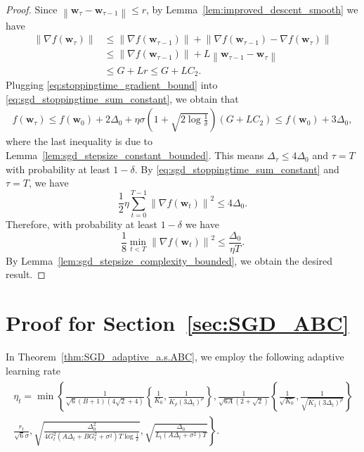 \documentclass{article}
\newcommand{\Norm}[1]{\left\|#1\right\|}
\newcommand{\paren}[1]{\left( #1 \right)}
\newcommand{\bw}{\mathbf{w}}
\begin{document}
\begin{proof}
    Since $\Norm{\bw_\tau-\bw_{\tau-1}}\leq r$, by Lemma~\ref{lem:improved_descent_smooth} we have
    \begin{equation}\label{eq:stoppingtime_gradient_bound}
        \begin{aligned}
            \Norm{\nabla f(\bw_\tau)}&\leq\Norm{\nabla f(\bw_{\tau-1})}+\Norm{\nabla f(\bw_{\tau-1})-\nabla f(\bw_\tau)}\\
            &\leq \Norm{\nabla f(\bw_{\tau-1})}+L\Norm{\bw_{\tau-1}-\bw_\tau}\\
            &\leq G+Lr\leq G+LC_2.
        \end{aligned}
    \end{equation}
    Plugging \eqref{eq:stoppingtime_gradient_bound} into \eqref{eq:sgd_stoppingtime_sum_constant}, we obtain that
    \begin{align*}
        f(\bw_\tau)\leq f(\bw_0)+2\Delta_0+\eta\sigma\paren{1+\sqrt{2\log\frac{1}{\delta}}}\paren{G+LC_2}\leq f(\bw_0)+3\Delta_0,
    \end{align*}
    where the last inequality is due to Lemma~\ref{lem:sgd_stepsize_constant_bounded}. This means $\Delta_\tau\leq 4\Delta_0$ and $\tau=T$ with probability at least $1-\delta$. By \eqref{eq:sgd_stoppingtime_sum_constant} and $\tau=T$, we have
    $$\frac{1}{2}\eta\sum_{t=0}^{T-1}\Norm{\nabla f(\bw_t)}^2\leq 4\Delta_0.$$
    Therefore, with probability at least $1-\delta$ we have
    $$\frac{1}{8}\min_{t<T}\Norm{\nabla f(\bw_t)}^2\leq \frac{\Delta_0}{\eta T}.$$
    By Lemma~\ref{lem:sgd_stepsize_complexity_bounded}, we obtain the desired result.
    
\end{proof}

\section{Proof for Section~\ref{sec:SGD_ABC}}\label{apx:pf_ABC}
In Theorem~\ref{thm:SGD_adaptive_a.s.ABC}, we employ the following adaptive learning rate
\begin{align}\label{eq:learning_rate_thm_ABC_adaptive}
    \begin{gathered}
    \eta_t=\min \left\{\frac{1}{\sqrt{6}(B+1)(4 \sqrt{2}+4)}\left\{\frac{1}{K_0}, \frac{1}{K_\rho\left(3 \Delta_t\right)^\rho}\right\}, \frac{1}{\sqrt{6 A}(2+\sqrt{2})}\left\{\frac{1}{\sqrt{K_0}}, \frac{1}{\sqrt{K_1\left(3 \Delta_t\right)^\rho}}\right\}\right. \\
    \left.\frac{r_t}{\sqrt{6} \sigma}, \sqrt{\frac{\Delta_0^2}{4 G_t^2\left(A \Delta_t+B G_t^2+\sigma^2\right) T \log \frac{1}{\delta}}}, \sqrt{\frac{\Delta_0}{L_t\left(A \Delta_t+\sigma^2\right) T}}\right\} .
    \end{gathered}
\end{align}
\end{document}
